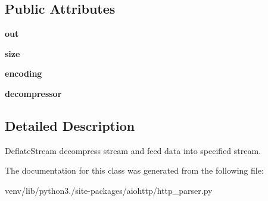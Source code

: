 \subsection*{Public Attributes}
\begin{DoxyCompactItemize}
\item 
\mbox{\label{classaiohttp_1_1http__parser_1_1_deflate_buffer_a86a501a6b2b59a2d2f768bf950702d56}} 
{\bfseries out}
\item 
\mbox{\label{classaiohttp_1_1http__parser_1_1_deflate_buffer_a385bbee9f35f662d3a564eb68600c18b}} 
{\bfseries size}
\item 
\mbox{\label{classaiohttp_1_1http__parser_1_1_deflate_buffer_abf7af1d0f078987614c42e6ffd24637a}} 
{\bfseries encoding}
\item 
\mbox{\label{classaiohttp_1_1http__parser_1_1_deflate_buffer_ae463bc09a0c313721b0795e6748ef6b1}} 
{\bfseries decompressor}
\end{DoxyCompactItemize}


\subsection{Detailed Description}
\begin{DoxyVerb}DeflateStream decompress stream and feed data into specified stream.\end{DoxyVerb}
 

The documentation for this class was generated from the following file\+:\begin{DoxyCompactItemize}
\item 
venv/lib/python3./site-\/packages/aiohttp/http\+\_\+parser.\+py\end{DoxyCompactItemize}
